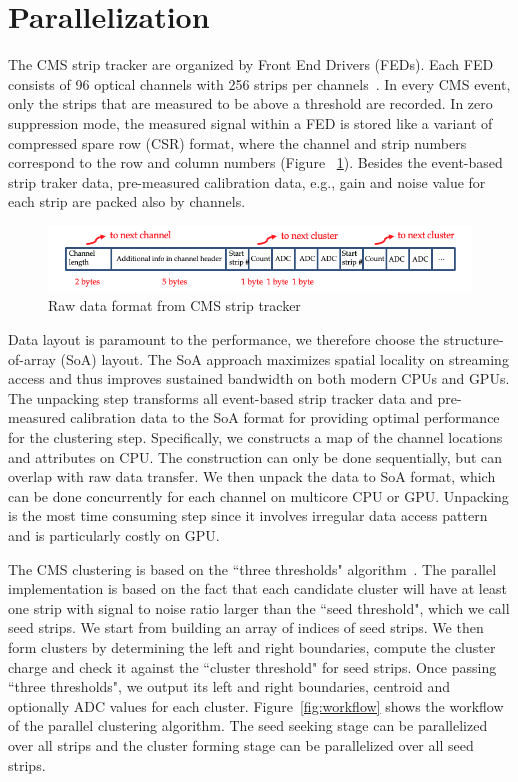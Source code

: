 \documentclass[10pt, paper=a4, UKenglish]{article}
\begin{document}
\section{Parallelization}
\label{para}
The CMS strip tracker are organized by Front End Drivers (FEDs). Each FED consists of 96 optical channels with 256 strips per channels~\cite{Collaboration_2014}. In every CMS event, only the strips that are measured to be above a threshold are recorded. In zero suppression mode, the measured signal within a FED is stored like a variant of compressed spare row (CSR) format, where the channel and strip numbers correspond to the row and column numbers (Figure ~\ref{fig:SSTlayout}). Besides the event-based strip traker data, pre-measured calibration data, e.g., gain and noise value for each strip are packed also by channels. 

\begin{figure}[!htb]
  \centering
  \includegraphics[scale=0.5]{SSTlayout}
  \caption{Raw data format from CMS strip tracker}
  \label{fig:SSTlayout}
\end{figure}

Data layout is paramount to the performance, we therefore choose the structure-of-array (SoA) layout. The SoA approach maximizes spatial locality on streaming access and thus improves sustained bandwidth on both modern CPUs and GPUs. The unpacking step transforms all event-based strip tracker data and pre-measured calibration data to the SoA format for providing optimal performance for the clustering step. Specifically, we constructs a map of the channel locations and attributes on CPU. The construction can only be done sequentially, but can overlap with raw data transfer. We then unpack the data to SoA format, which can be done concurrently for each channel on multicore CPU or GPU. Unpacking is the most time consuming step since it involves irregular data access pattern and is particularly costly on GPU. 

The CMS clustering is based on the ``three thresholds" algorithm~\cite{Collaboration_2014}. The parallel implementation is based on the fact that each candidate cluster will have at least one strip with signal to noise ratio larger than the ``seed threshold", which we call seed strips. We start from building an array of indices of seed strips. We then form clusters by determining the left and right boundaries, compute the cluster charge and check it against the ``cluster threshold" for seed strips. Once passing ``three thresholds", we output its left and right boundaries, centroid and optionally ADC values for each cluster. Figure~\ref{fig:workflow} shows the workflow of the parallel clustering algorithm. The seed seeking stage can be parallelized over all strips and the cluster forming stage can be parallelized over all seed strips. 
\end{document}
